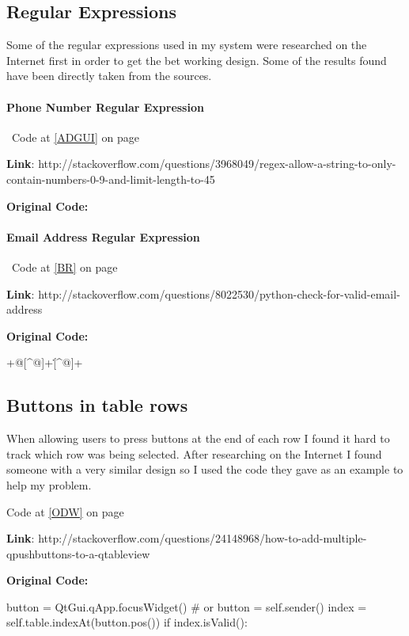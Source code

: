 \subsection{Regular Expressions}


Some of the regular expressions used in my system were researched on the Internet first in order to get the bet working design. Some of the results found have been directly taken from the sources.

\paragraph{Phone Number Regular Expression}
\
Code at \ref{ADGUI} on page \pageref{ADGUI}
\

 \textbf{Link}: http://stackoverflow.com/questions/3968049/regex-allow-a-string-to-only-contain-numbers-0-9-and-limit-length-to-45

\textbf{Original Code:}

\paragraph{Email Address Regular Expression}
\
Code at \ref{BR} on page \pageref{BR}
\

\textbf{Link}: http://stackoverflow.com/questions/8022530/python-check-for-valid-email-address

\textbf{Original Code:}
\begin{python}
[^@]+@[^@]+\.[^@]+
\end{python}

\subsection{Buttons in table rows}

When allowing users to press buttons at the end of each row I found it hard to track which row was being selected. After researching on the Internet I found someone with a very similar design so I used the code they gave as an example to help my problem. 

Code at \ref{ODW} on page \pageref{ODW} 

\textbf{Link}: http://stackoverflow.com/questions/24148968/how-to-add-multiple-qpushbuttons-to-a-qtableview

\textbf{Original Code:}

\begin{python}
 button = QtGui.qApp.focusWidget()
        # or button = self.sender()
        index = self.table.indexAt(button.pos())
        if index.isValid():
\end{python}
\newpage

